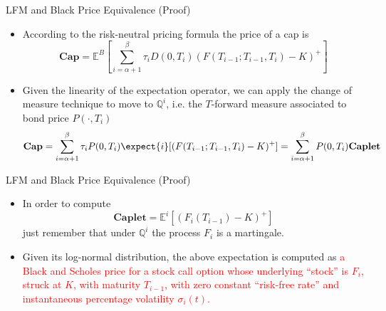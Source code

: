 \documentclass{beamer}
\begin{document}
\begin{frame}{LFM and Black Price Equivalence (Proof)}
	\begin{itemize}
	\item<1-> According to the risk-neutral pricing formula the price of a cap is 
	\begin{equation*}
		\textbf{Cap}=\mathbb{E}^B\left[\sum_{i=\alpha+1}^\beta 	\tau_iD(0, T_i)(F(T_{i-1}; T_{i-1}, T_i) - K)^+\right]
	\end{equation*}
	\item<2-> Given the linearity of the expectation operator, we can apply the change of measure technique to move to $\mathbb{Q}^i$, i.e. the $T$-forward measure associated to bond price $P(\cdot,T_i)$
	\begin{equation*}
		\textbf{Cap}= \sum_{i=\alpha+1}^\beta \tau_i P(0, T_i)\expect{i}[(F(T_{i-1}; T_{i-1}, T_i) - K)^+] = \sum_{i=\alpha+1}^\beta P(0, T_i)\textbf{Caplet}
	\end{equation*}
	\end{itemize}
\end{frame}

\begin{frame}{LFM and Black Price Equivalence (Proof)}
	\begin{itemize}
	\item In order to compute 
	\begin{equation*}
		\textbf{Caplet} = \mathbb{E}^i[(F_i(T_{i-1}) - K)^+]
	\end{equation*}
	just remember that under $\mathbb{Q}^i$ the process $F_i$ is a martingale.
	\item Given its log-normal distribution, the above expectation is computed as \textcolor{red}{a Black and Scholes price for a stock call option whose underlying “stock” is $F_i$, struck at $K$, with maturity $T_{i-1}$, with zero constant “risk-free rate” and instantaneous percentage volatility $\sigma_i(t)$.}
\end{itemize}
\end{frame}
\end{document}
